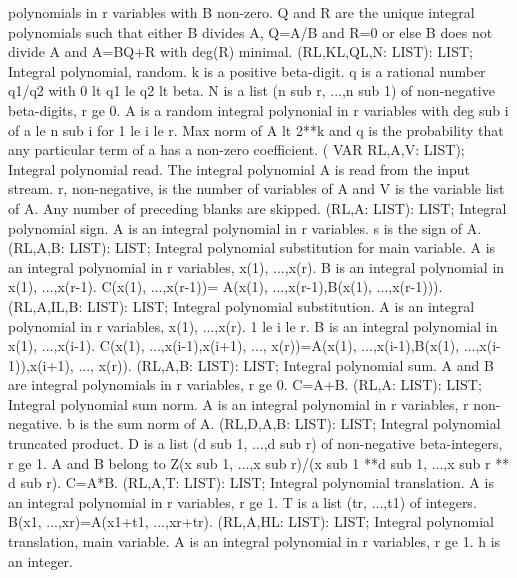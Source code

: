 polynomials in r variables with B non-zero.  Q and R are the unique
integral polynomials such that either B divides A, Q=A/B and R=0 or
else B does not divide A and A=BQ+R with deg(R) minimal. \ecom 
{} (RL,KL,QL,N: LIST): LIST; \eproc
\bcom Integral polynomial, random. k is a positive beta-digit. q is a
rational number q1/q2 with 0 lt q1 le q2 lt beta.  N is a list
(n sub r, ...,n sub 1) of non-negative beta-digits, r ge 0.  A is a
random integral polynonial in r variables with deg sub i of a le n
sub i for 1 le i le r.  Max norm of A lt 2**k and q is the
probability that any particular term of a has a non-zero coefficient. \ecom 
{} ( VAR RL,A,V: LIST); \eproc
\bcom Integral polynomial read. The integral polynomial A is read from the
input stream.  r, non-negative, is the number of variables of A and V
is the variable list of A. Any number of preceding blanks are skipped. \ecom 
{} (RL,A: LIST): LIST; \eproc
\bcom Integral polynomial sign. A is an integral polynomial in r
variables. s is the sign of A. \ecom 
{} (RL,A,B: LIST): LIST; \eproc
\bcom Integral polynomial substitution for main variable. A is an
integral polynomial in r variables, x(1), ...,x(r).  B is an
integral polynomial in x(1), ...,x(r-1).  C(x(1), ...,x(r-1))=
A(x(1), ...,x(r-1),B(x(1), ...,x(r-1))). \ecom 
{} (RL,A,IL,B: LIST): LIST; \eproc
\bcom Integral polynomial substitution. A is an integral polynomial in
r variables, x(1), ...,x(r).  1 le i le r.  B is an integral
polynomial in x(1), ...,x(i-1).  C(x(1), ...,x(i-1),x(i+1), ...,
x(r))=A(x(1), ...,x(i-1),B(x(1), ...,x(i-1)),x(i+1), ..., x(r)). \ecom 
{} (RL,A,B: LIST): LIST; \eproc
\bcom Integral polynomial sum. A and B are integral polynomials in r
variables, r ge 0. C=A+B. \ecom 
{} (RL,A: LIST): LIST; \eproc
\bcom Integral polynomial sum norm. A is an integral polynomial in r
variables, r non-negative. b is the sum norm of A. \ecom 
{} (RL,D,A,B: LIST): LIST; \eproc
\bcom Integral polynomial truncated product. D is a list (d sub 1, ...,d sub r)
of non-negative beta-integers, r ge 1.  A and B belong to
Z(x sub 1, ...,x sub r)/(x sub 1 **d sub 1, ...,x sub r ** d sub r).
C=A*B. \ecom 
{} (RL,A,T: LIST): LIST; \eproc
\bcom Integral polynomial translation. A is an integral polynomial in r
variables, r ge 1.  T is a list (tr, ...,t1) of integers.
B(x1, ...,xr)=A(x1+t1, ...,xr+tr). \ecom 
{} (RL,A,HL: LIST): LIST; \eproc
\bcom Integral polynomial translation, main variable. A is an integral
polynomial in r variables, r ge 1.  h is an integer.
